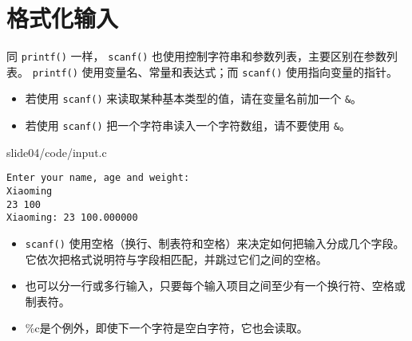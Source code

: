 \section{格式化输入}
\begin{frame}[fragile]\ft{\secname}
  同 \lstinline|printf()| 一样， \lstinline|scanf()| 也使用控制字符串和参数列表，主要区别在参数列表。 \lstinline|printf()| 使用变量名、常量和表达式；而 \lstinline|scanf()| 使用指向变量的指针。
\end{frame}

\begin{frame}[fragile]
\begin{itemize}
\item 
  若使用 \lstinline|scanf()| 来读取某种基本类型的值，请在变量名前加一个 \lstinline|&|。 \\[0.1in]
\item
  若使用 \lstinline|scanf()| 把一个字符串读入一个字符数组，请不要使用 \lstinline|&|。
\end{itemize}
\end{frame}

\begin{frame}[fragile]
  
  {slide04/code/input.c}
\end{frame}

\begin{frame}[fragile]
\begin{lstlisting}[showspaces=true,backgroundcolor=\color{red!20}]
Enter your name, age and weight:
Xiaoming
23 100
Xiaoming: 23 100.000000
\end{lstlisting}
\end{frame}

\begin{frame}[fragile]
\begin{itemize}
\item
  \lstinline|scanf()| 使用空格（换行、制表符和空格）来决定如何把输入分成几个字段。
它依次把格式说明符与字段相匹配，并跳过它们之间的空格。\\[0.1in]
\item
也可以分一行或多行输入，只要每个输入项目之间至少有一个换行符、空格或制表符。\\[0.1in]
\item
\%c是个例外，即使下一个字符是空白字符，它也会读取。
\end{itemize}
\end{frame}

